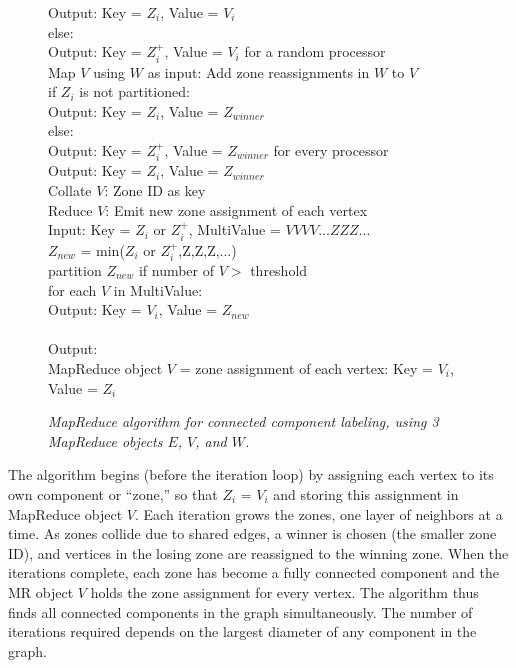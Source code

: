\begin{figure}[htb]
\begin{center}
{\begin{minipage}{\textwidth}
\begin{tabbing}
    \> \> \> Output: Key = $Z_i$, Value = $V_i$ \\
    \> \> else: \\
    \> \> \> Output: Key = $Z_i^+$, Value = $V_i$ for a random processor \\
 Map $V$ using $W$ as input: Add zone reassignments in $W$ to $V$ \\
    \> \> if $Z_i$ is not partitioned: \\
    \> \> \> Output: Key = $Z_i$, Value = $Z_{winner}$ \\
    \> \> else: \\
    \> \> \> Output: Key = $Z_i^+$, Value = $Z_{winner}$ for every processor \\
    \> \> \> Output: Key = $Z_i$, Value = $Z_{winner}$ \\
 Collate $V$: Zone ID as key \\
 Reduce $V$: Emit new zone assignment of each vertex \\
       \> \> Input: Key = $Z_i$ or $Z_i^+$, MultiValue = $V V V V ... Z Z Z ...$ \\
       \> \> $Z_{new}$ = min($Z_i$ or $Z_i^+$,Z,Z,Z,...) \\
       \> \> partition $Z_{new}$ if number of $V >$ threshold \\
       \> \> for each $V$ in MultiValue: \\
       \> \> \> Output: Key = $V_i$, Value = $Z_{new}$ \\
\\
Output: \\
\> MapReduce object $V$ = zone assignment of each vertex: Key = $V_i$, Value = $Z_i$ \\

  \end{tabbing}
 \end{minipage}}\end{center}

 \caption{\it MapReduce algorithm for connected component labeling,
 using 3 MapReduce objects $E$, $V$, and $W$.}

 \label{fig:cc}
\end{figure}

The algorithm begins (before the iteration loop) by assigning each
vertex to its own component or ``zone,'' so that $Z_i$ = $V_i$ and
storing this assignment in MapReduce object $V$.  Each iteration grows
the zones, one layer of neighbors at a time.  As zones collide due to
shared edges, a winner is chosen (the smaller zone ID), and vertices
in the losing zone are reassigned to the winning zone.  When the
iterations complete, each zone has become a fully connected component
and the MR object $V$ holds the zone assignment for every vertex.  The
algorithm thus finds all connected components in the graph
simultaneously.  The number of iterations required depends on the
largest diameter of any component in the graph.

